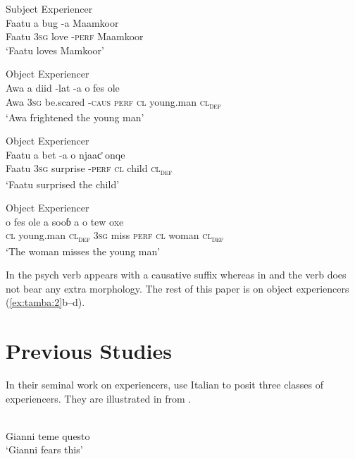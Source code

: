 \documentclass[output=paper]{langscibook}
\begin{document}
\ea \label{ex:tamba:2}
\ea Subject Experiencer \label{ex:tamba:2a}\\
\gll    Faatu    a              bug  {}-a              Maamkoor\\
        Faatu   \textsc{3sg}  love  {}-\textsc{perf}    Maamkoor\\
\glt    `Faatu loves Mamkoor'

\ex Object Experiencer \label{ex:tamba:2b}\\
\gll Awa a diid -lat -a o fes ole\\
    Awa \textsc{3sg} be.scared -\textsc{caus} \textsc{perf} \textsc{cl} young.man \textsc{cl\textsubscript{def}}\\
\glt `Awa frightened the young man'

\ex Object Experiencer \label{ex:tamba:2c}\\
\gll Faatu  a               bet         -a       o               njaaƈ       onqe\\
    Faatu   \textsc{3sg}    surprise    -\textsc{perf}  \textsc{cl}    child   \textsc{cl\textsubscript{def}} \\
\glt `Faatu surprised the child'


\ex Object Experiencer \label{ex:tamba:2d}\\
\gll o     fes             ole        a       sooɓ  a        o  tew   oxe\\
 \textsc{cl} young.man  \textsc{cl\textsubscript{def}}     \textsc{3sg}       miss  \textsc{perf}   \textsc{cl}  woman \textsc{cl\textsubscript{def}}\\
\glt   `The woman  misses the young man'
\z
\z 

In  the psych verb appears with a causative suffix whereas in   and  the verb does not bear any extra morphology. The rest of this paper is on object experiencers (\ref{ex:tamba:2}b--d).

\section{Previous Studies}

In their seminal work on experiencers, \citet{Belletti1988} use Italian to posit three classes of experiencers. They are illustrated in  from \citet[291--292]{Belletti1988}.

\ea \label{ex:tamba:3}
\\
\ea \label{ex:tamba:3a}
 Gianni teme questo\\
\glt `Gianni fears this'
\end{document}
